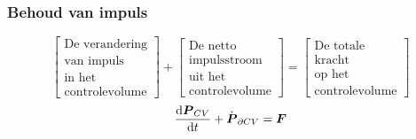 \documentclass[t]{beamer}
\begin{document}
  	\begin{frame}
		\frametitle{Behoud van impuls}
		\vspace{0.7cm}
		\begin{equation*}
			\left[
				\begin{array}{c}
					\mbox{De verandering} \\ \mbox{van impuls} \\ \mbox{in het}  \\ \mbox{controlevolume}
				\end{array}
			\right]
			+
			\left[
				\begin{array}{c}
					\mbox{De netto} \\ \mbox{impulsstroom} \\ \mbox{uit het} \\ \mbox{controlevolume}
				\end{array}
			\right]
			=
			\left[
				\begin{array}{c}
					\mbox{De totale} \\ \mbox{kracht} \\ \mbox{op het} \\ \mbox{controlevolume}
				\end{array}
			\right]
			\label{eqn:controlevolume,behoud van impuls,woorden}
		\end{equation*}
		\vspace{1cm}
		\pause
		\begin{equation}
			\frac{\mathrm{d} \boldsymbol{P}_{CV}}{\mathrm{d} t} + \dot{\boldsymbol{P}}_{\partial CV} =  \boldsymbol{F}
			\label{eqn:controlevolume,behoud van impuls}
		\end{equation}
	\end{frame}	
\end{document}
